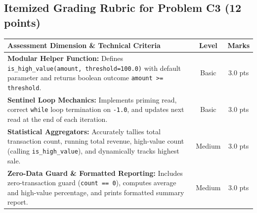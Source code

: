 \documentclass[11pt,a4paper]{article}
\begin{document}
\newpage

\subsection*{Itemized Grading Rubric for Problem C3 (12 points)}

\begin{center}
\renewcommand{\arraystretch}{1.18}
\setlength{\tabcolsep}{3.5pt}
\begin{tabularx}{\textwidth}{|X|c|c|}
\hline
\textbf{Assessment Dimension \& Technical Criteria} & \textbf{Level} & \textbf{Marks} \\
\hline
\textbf{Modular Helper Function:} Defines \texttt{is\_high\_value(amount, threshold=100.0)} with default parameter and returns boolean outcome \texttt{amount >= threshold}. & Basic & 3.0 pts \\
\hline
\textbf{Sentinel Loop Mechanics:} Implements priming read, correct \texttt{while} loop termination on \texttt{-1.0}, and updates next read at the end of each iteration. & Basic & 3.0 pts \\
\hline
\textbf{Statistical Aggregators:} Accurately tallies total transaction count, running total revenue, high-value count (calling \texttt{is\_high\_value}), and dynamically tracks highest sale. & Medium & 3.0 pts \\
\hline
\textbf{Zero-Data Guard \& Formatted Reporting:} Includes zero-transaction guard (\texttt{count == 0}), computes average and high-value percentage, and prints formatted summary report. & Medium & 3.0 pts \\
\hline
\end{tabularx}
\end{center}
\end{document}
